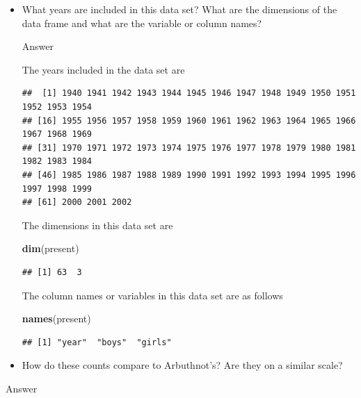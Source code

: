 \documentclass[
]{article}
\newenvironment{Shaded}{\begin{snugshade}}{\end{snugshade}}
\newcommand{\KeywordTok}[1]{\textcolor[rgb]{0.13,0.29,0.53}{\textbf{#1}}}
\newcommand{\NormalTok}[1]{#1}
\newcommand{\OperatorTok}[1]{\textcolor[rgb]{0.81,0.36,0.00}{\textbf{#1}}}
\begin{document}
\begin{itemize}
\item
  What years are included in this data set? What are the dimensions of
  the data frame and what are the variable or column names?

  {Answer}

  The years included in the data set are

\begin{Shaded}
\end{Shaded}

\begin{verbatim}
##  [1] 1940 1941 1942 1943 1944 1945 1946 1947 1948 1949 1950 1951 1952 1953 1954
## [16] 1955 1956 1957 1958 1959 1960 1961 1962 1963 1964 1965 1966 1967 1968 1969
## [31] 1970 1971 1972 1973 1974 1975 1976 1977 1978 1979 1980 1981 1982 1983 1984
## [46] 1985 1986 1987 1988 1989 1990 1991 1992 1993 1994 1995 1996 1997 1998 1999
## [61] 2000 2001 2002
\end{verbatim}

  The dimensions in this data set are

\begin{Shaded}
\begin{Highlighting}[]
\KeywordTok{dim}\NormalTok{(present)}
\end{Highlighting}
\end{Shaded}

\begin{verbatim}
## [1] 63  3
\end{verbatim}

  The column names or variables in this data set are as follows

\begin{Shaded}
\begin{Highlighting}[]
\KeywordTok{names}\NormalTok{(present)}
\end{Highlighting}
\end{Shaded}

\begin{verbatim}
## [1] "year"  "boys"  "girls"
\end{verbatim}
\item
  How do these counts compare to Arbuthnot's? Are they on a similar
  scale?
\end{itemize}

{Answer}
\end{document}
